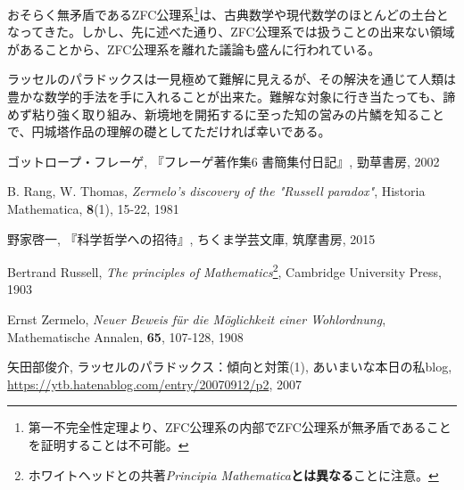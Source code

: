 \documentclass[10pt, a5paper, twoside]{jsarticle}
\theoremstyle{definition}
\begin{document}
		おそらく無矛盾であるZFC公理系\footnote{第一不完全性定理より、ZFC公理系の内部でZFC公理系が無矛盾であることを証明することは不可能。}は、古典数学や現代数学のほとんどの土台となってきた。しかし、先に述べた通り、ZFC公理系では扱うことの出来ない領域があることから、ZFC公理系を離れた議論も盛んに行われている。

		ラッセルのパラドックスは一見極めて難解に見えるが、その解決を通じて人類は豊かな数学的手法を手に入れることが出来た。難解な対象に行き当たっても、諦めず粘り強く取り組み、新境地を開拓するに至った知の営みの片鱗を知ることで、円城塔作品の理解の礎としてただければ幸いである。

	\begin{thebibliography}{99}

		 ゴットロープ・フレーゲ, 『フレーゲ著作集6 書簡集付日記』, 勁草書房, 2002

		 B. Rang, W. Thomas, \textit{Zermelo's discovery of the "Russell paradox"}, Historia Mathematica, \textbf{8}(1), 15-22, 1981

		 野家啓一, 『科学哲学への招待』, ちくま学芸文庫, 筑摩書房, 2015

		 Bertrand Russell, \textit{The principles of Mathematics}\footnote{ホワイトヘッドとの共著\textit{Principia Mathematica}\textbf{とは異なる}ことに注意。}, Cambridge University Press, 1903

		 Ernst Zermelo, \textit{Neuer Beweis für die Möglichkeit einer Wohlordnung}, Mathematische Annalen, \textbf{65}, 107-128, 1908

		 矢田部俊介, ラッセルのパラドックス：傾向と対策(1), あいまいな本日の私blog, \url{https://ytb.hatenablog.com/entry/20070912/p2}, 2007

	\end{thebibliography}
\end{document}
